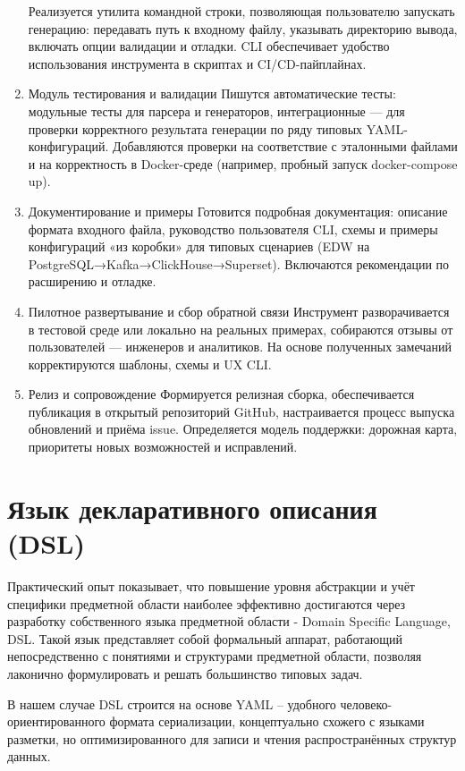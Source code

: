 \begin{enumerate}[label=\textbf{Этап \arabic*.}]
            Реализуется утилита командной строки, позволяющая пользователю запускать генерацию: передавать путь к входному файлу,  указывать директорию вывода, включать опции валидации и отладки. CLI обеспечивает удобство использования инструмента в скриптах и CI/CD-пайплайнах\cite{acid}.
      \item Модуль тестирования и валидации
            Пишутся автоматические тесты: модульные тесты для парсера и генераторов, интеграционные — для проверки корректного результата генерации по ряду типовых YAML-конфигураций. Добавляются проверки на соответствие с эталонными файлами и на корректность в Docker-среде (например, пробный запуск docker-compose up).
      \item Документирование и примеры
            Готовится подробная документация: описание формата входного файла, руководство пользователя CLI, схемы и примеры конфигураций «из коробки» для типовых сценариев (EDW на PostgreSQL→Kafka→ClickHouse→Superset). Включаются рекомендации по расширению и отладке.
      \item Пилотное развертывание и сбор обратной связи
            Инструмент разворачивается в тестовой среде или локально на реальных примерах, собираются отзывы от пользователей — инженеров и аналитиков. На основе полученных замечаний корректируются шаблоны, схемы и UX CLI.
      \item Релиз и сопровождение
            Формируется релизная сборка, обеспечивается публикация в открытый репозиторий GitHub, настраивается процесс выпуска обновлений и приёма issue. Определяется модель поддержки: дорожная карта, приоритеты новых возможностей и исправлений.
\end{enumerate}


\section{Язык декларативного описания (DSL)} \label{ch3:dsl}
Практический опыт показывает, что повышение уровня абстракции и учёт специфики предметной области наиболее эффективно достигаются через разработку собственного языка предметной области - Domain Specific Language, DSL\cite{novikov_grammatik}\cite{ulman}. Такой язык представляет собой формальный аппарат, работающий непосредственно с понятиями и структурами предметной области, позволяя лаконично формулировать и решать большинство типовых задач.

В нашем случае DSL строится на основе YAML\cite{yaml} – удобного человеко-ориентированного формата сериализации, концептуально схожего с языками разметки, но оптимизированного для записи и чтения распространённых структур данных.


